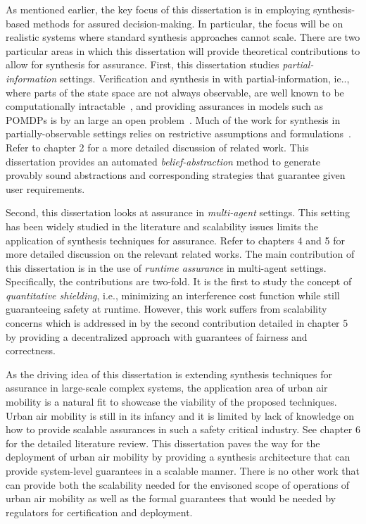 As mentioned earlier, the key focus of this dissertation is in employing synthesis-based methods for assured decision-making. In particular, the focus will be on realistic systems where standard synthesis approaches cannot scale. There are two particular areas in which this dissertation will provide theoretical contributions to allow for synthesis for assurance. First, this dissertation studies \emph{partial-information} settings. Verification and synthesis in with partial-information, ie.., where parts of the state space are not always observable, are well known to be computationally intractable~\cite{Baier2009ModelCL}, and providing assurances in models such as POMDPs is by an large an open problem~\cite{partialinfoltl}. Much of the work for synthesis in partially-observable settings relies on restrictive assumptions and formulations~\cite{6426524,6426174}. Refer to chapter 2 for a more detailed discussion of related work. This dissertation provides an automated \emph{belief-abstraction} method to generate provably sound abstractions and corresponding strategies that guarantee given user requirements. 

Second, this dissertation looks at assurance in \emph{multi-agent} settings. This setting has been widely studied in the literature and scalability issues limits the application of synthesis techniques for assurance. Refer to chapters 4 and 5 for more detailed discussion on the relevant related works. The main contribution of this dissertation is in the use of \emph{runtime assurance} in multi-agent settings. Specifically, the contributions are two-fold. It is the first to study the concept of \emph{quantitative shielding}, i.e., minimizing an interference cost function while still guaranteeing safety at runtime. However, this work suffers from scalability concerns which is addressed in by the second contribution detailed in chapter 5 by providing a decentralized approach with guarantees of fairness and correctness. 

As the driving idea of this dissertation is extending synthesis techniques for assurance in large-scale complex systems, the application area of urban air mobility is a natural fit to showcase the viability of the proposed techniques. Urban air mobility is still in its infancy and it is limited by lack of knowledge on how to provide scalable assurances in such a safety critical industry. See chapter 6 for the detailed literature review. This dissertation paves the way for the deployment of urban air mobility by providing a synthesis architecture that can provide system-level guarantees in a scalable manner. There is no other work that can provide both the scalability needed for the envisoned scope of operations of urban air mobility as well as the formal guarantees that would be needed by regulators for certification and deployment. 



